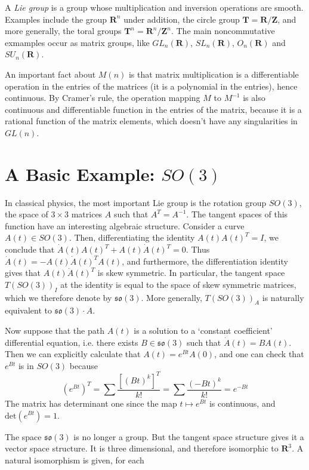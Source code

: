 A \emph{Lie group} is a group whose multiplication and inversion operations are smooth. Examples include the group $\mathbf{R}^n$ under addition, the circle group $\mathbf{T} = \mathbf{R}/\mathbf{Z}$, and more generally, the toral groups $\mathbf{T}^n = \mathbf{R}^n / \mathbf{Z}^n$. The main noncommutative exmamples occur as matrix groups, like $GL_n(\mathbf{R})$, $SL_n(\mathbf{R})$, $O_n(\mathbf{R})$ and $SU_n(\mathbf{R})$.

An important fact about $M(n)$ is that matrix multiplication is a differentiable operation in the entries of the matrices (it is a polynomial in the entries), hence continuous. By Cramer's rule, the operation mapping $M$ to $M^{-1}$ is also continuous and differentiable function in the entries of the matrix, because it is a rational function of the matrix elements, which doesn't have any singularities in $GL(n)$.

\section{A Basic Example: $SO(3)$}

In classical physics, the most important Lie group is the rotation group $SO(3)$, the space of $3 \times 3$ matrices $A$ such that $A^T = A^{-1}$. The tangent spaces of this function have an interesting algebraic structure. Consider a curve $A(t) \in SO(3)$. Then, differentiating the identity $A(t) A(t)^T = I$, we conclude that $\dot{A}(t) A(t)^T + A(t) \dot{A}(t)^T = 0$. Thus $\dot{A}(t) = - A(t) \dot{A}(t)^T A(t)$, and furthermore, the differentiation identity gives that $A(t) \dot{A}(t)^T$ is skew symmetric. In particular, the tangent space $T(SO(3))_I$ at the identity is equal to the space of skew symmetric matrices, which we therefore denote by $\mathfrak{so}(3)$. More generally, $T(SO(3))_A$ is naturally equivalent to $\mathfrak{so}(3) \cdot A$.

Now suppose that the path $A(t)$ is a solution to a `constant coefficient' differential equation, i.e. there exists $B \in \mathfrak{so}(3)$ such that $\dot{A}(t) = B A(t)$. Then we can explicitly calculate that $A(t) = e^{Bt} A(0)$, and one can check that $e^{Bt}$ is in $SO(3)$ because
%
\[ (e^{Bt})^T = \sum \frac{[(Bt)^k]^T}{k!} = \sum \frac{(-Bt)^k}{k!} = e^{-Bt} \]
%
The matrix has determinant one since the map $t \mapsto e^{Bt}$ is continuous, and $\text{det}(e^{Bt}) = 1$.

The space $\mathfrak{so}(3)$ is no longer a group. But the tangent space structure gives it a vector space structure. It is three dimensional, and therefore isomorphic to $\mathbf{R}^3$. A natural isomorphism is given, for each 

